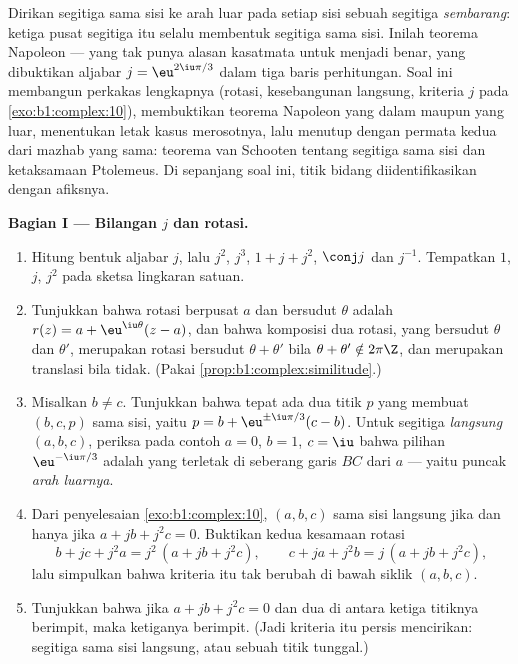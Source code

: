 \begin{problem}\label{pb:b1:complex:1}
Dirikan segitiga sama sisi ke arah luar pada setiap sisi sebuah
segitiga \emph{sembarang}: ketiga pusat segitiga itu
selalu membentuk segitiga sama sisi. Inilah teorema Napoleon
 ---  yang tak punya alasan kasatmata untuk
menjadi benar, yang dibuktikan aljabar $j = \eu^{2\iu\pi/3}$ dalam tiga
baris perhitungan. Soal ini membangun perkakas lengkapnya
(rotasi, kesebangunan langsung, kriteria $j$ pada
\cref{exo:b1:complex:10}), membuktikan teorema Napoleon yang dalam maupun
yang luar, menentukan letak kasus merosotnya, lalu menutup dengan permata kedua
dari mazhab yang sama: teorema van Schooten tentang segitiga sama sisi
dan ketaksamaan Ptolemeus. Di sepanjang soal ini, titik bidang
diidentifikasikan dengan afiksnya.

\medskip
\noindent\textbf{Bagian I --- Bilangan $j$ dan rotasi.}
\begin{enumerate}
  \item Hitung bentuk aljabar $j$, lalu $j^2$, $j^3$, $1 + j
        + j^2$, $\conj j$ dan $j^{-1}$. Tempatkan $1$, $j$, $j^2$ pada
        sketsa lingkaran satuan.
  \item Tunjukkan bahwa rotasi berpusat $a$ dan bersudut $\theta$ adalah
        $r(z) = a + \eu^{\iu\theta}(z - a)$, dan bahwa
        komposisi dua rotasi, yang bersudut $\theta$ dan
        $\theta'$, merupakan rotasi bersudut $\theta + \theta'$ bila
        $\theta + \theta' \notin 2\pi\Z$, dan merupakan translasi
        bila tidak. (Pakai \cref{prop:b1:complex:similitude}.)
  \item Misalkan $b \neq c$. Tunjukkan bahwa tepat ada dua titik $p$
        yang membuat $(b, c, p)$ sama sisi, yaitu $p = b +
        \eu^{\pm\iu\pi/3}(c - b)$. Untuk segitiga \emph{langsung}
        $(a, b, c)$, periksa pada contoh $a = 0$, $b = 1$, $c =
        \iu$ bahwa pilihan $\eu^{-\iu\pi/3}$ adalah yang terletak di
        seberang garis $BC$ dari $a$ --- yaitu puncak
        \emph{arah luarnya}.
  \item Dari penyelesaian \cref{exo:b1:complex:10}, $(a, b, c)$
        sama sisi langsung jika dan hanya jika $a + jb + j^2c = 0$. Buktikan kedua
        kesamaan rotasi
        \[
        b + jc + j^2a = j^2\,(a + jb + j^2c),
        \qquad
        c + ja + j^2b = j\,(a + jb + j^2c),
        \]
        lalu simpulkan bahwa kriteria itu tak berubah di bawah
         siklik $(a, b, c)$.
  \item Tunjukkan bahwa jika $a + jb + j^2c = 0$ dan dua di antara ketiga titiknya
        berimpit, maka ketiganya berimpit. (Jadi kriteria itu persis
        mencirikan: segitiga sama sisi langsung, atau sebuah titik
        tunggal.)
\end{enumerate}


\end{problem}

